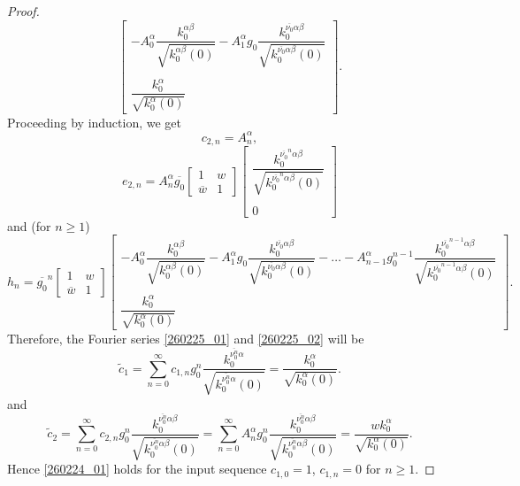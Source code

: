 \documentclass[reqno,11pt,centertags]{article}
\theoremstyle{definition}
\def\a{\alpha}
\def\b{\beta}
\begin{document}
\begin{proof}
$$\begin{bmatrix}
-A^\a_0\dfrac{k^{{\alpha\b}}_0}{\sqrt{k^{{\alpha\b}}_0(0)}}
-A^\a_1 g_0\dfrac{k^{\overline{\nu_0}\alpha\b}_0}{\sqrt{k^{\overline{\nu_0}\alpha\b}_0(0)}}
\\ \\
\dfrac{k^\a_0}{\sqrt{k^\a_0(0)}}
\end{bmatrix}.
$$
Proceeding by induction, we get
$$
c_{2,n}=A^\a_n,
$$
$$
e_{2,n}=
A^\a_n
\overline{g_0}
\begin{bmatrix}
1 & w \\
\overline{w} & 1
\end{bmatrix}
\begin{bmatrix}
\dfrac{k^{\overline{\nu_0}^n\alpha\b}_0}{\sqrt{k^{\overline{\nu_0}^n\alpha\b}_0(0)}}
\\ \\
0
\end{bmatrix}
$$
and (for $n\ge 1$)
$$
h_n=
\overline{g_0}^n
\begin{bmatrix}
1 & w \\
\overline{w} & 1
\end{bmatrix}
\begin{bmatrix}
-A^\a_0\dfrac{k^{{\alpha\b}}_0}{\sqrt{k^{{\alpha\b}}_0(0)}}
-A^\a_1 g_0\dfrac{k^{\overline{\nu_0}\alpha\b}_0}{\sqrt{k^{\overline{\nu_0}\alpha\b}_0(0)}}
-\ldots
-A^\a_{n-1} g_0^{n-1}\dfrac{k^{\overline{\nu_0}^{n-1}\alpha\b}_0}{\sqrt{k^{\overline{\nu_0}^{n-1}\alpha\b}_0(0)}}
\\ \\
\dfrac{k^\a_0}{\sqrt{k^\a_0(0)}}
\end{bmatrix}.
$$
Therefore, the Fourier series \eqref{260225_01} and \eqref{260225_02} will be
$$
\widetilde c_1=
\sum\limits_{n=0}^\infty
c_{1,n}
g^n_0\dfrac{k^{\overline{\nu_0^{n}}\a}_0}{\sqrt{k^{\overline{\nu_0^{n}}\a}_0(0)}}
=
\dfrac{k^\a_0}{\sqrt{k^\a_0(0)}}.
$$
and
$$
\widetilde c_2=
\sum\limits_{n=0}^\infty
c_{2,n}
g^n_0\dfrac{k^{\overline{\nu_0^{n}}\a\b}_0}{\sqrt{k^{\overline{\nu_0^{n}}\a\b}_0(0)}}
=
\sum\limits_{n=0}^\infty
A^\a_n
g^n_0\dfrac{k^{\overline{\nu_0^{n}}\a\b}_0}{\sqrt{k^{\overline{\nu_0^{n}}\a\b}_0(0)}}
=
\dfrac{wk^\a_0}{\sqrt{k^\a_0(0)}}.
$$
Hence \eqref{260224_01} holds for the input sequence $c_{1,0}=1$, $c_{1,n}=0$ for $n\ge 1$.


\end{proof}
\end{document}
